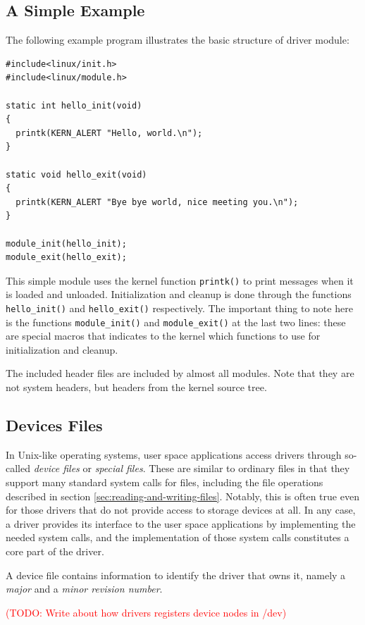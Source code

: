 \subsection{A Simple Example}
The following example program illustrates the basic structure of driver module:
\lstset{style=lststyle-c}
\begin{lstlisting}
#include<linux/init.h>
#include<linux/module.h>

static int hello_init(void)
{
  printk(KERN_ALERT "Hello, world.\n");
}

static void hello_exit(void)
{
  printk(KERN_ALERT "Bye bye world, nice meeting you.\n");
}

module_init(hello_init);
module_exit(hello_exit);
\end{lstlisting}
This simple module uses the kernel function \texttt{printk()} to print messages when it is loaded and unloaded. Initialization and cleanup is done through the functions \texttt{hello\_init()} and \texttt{hello\_exit()} respectively. The important thing to note here is the functions \texttt{module\_init()} and \texttt{module\_exit()} at the last two lines: these are special macros that indicates to the kernel which functions to use for initialization and cleanup.

The included header files are included by almost all modules. Note that they are not system headers, but headers from the kernel source tree.


\subsection{Devices Files}
In Unix-like operating systems, user space applications access drivers through so-called \emph{device files} or \emph{special files}. These are similar to ordinary files in that they support many standard system calls for files, including the file operations described in section \ref{sec:reading-and-writing-files}. Notably, this is often true even for those drivers that do not provide access to storage devices at all. In any case, a driver provides its interface to the user space applications by implementing the needed system calls, and the implementation of those system calls constitutes a core part of the driver.

A device file contains information to identify the driver that owns it, namely a \emph{major} and a \emph{minor revision number}.

\textcolor{red}{(TODO: Write about how drivers registers device nodes in /dev)}


